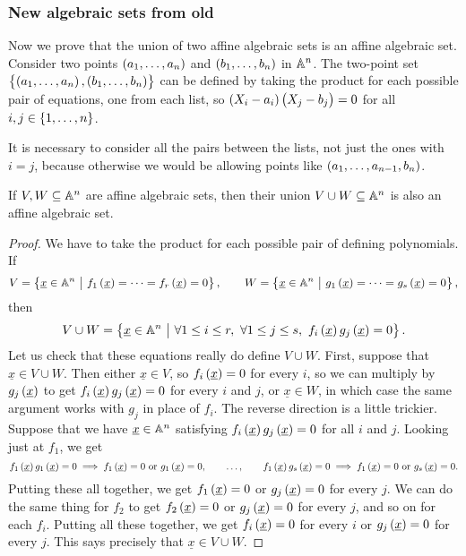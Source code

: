 \subsubsection{New algebraic sets from old}

Now we prove that the union of two affine algebraic sets is an affine algebraic set. Consider two points $ \br{a_1, \dots, a_n} $ and $ \br{b_1, \dots, b_n} $ in $ \AA^n $. The two-point set $ \cbr{\br{a_1, \dots, a_n}, \br{b_1, \dots, b_n}} $ can be defined by taking the product for each possible pair of equations, one from each list, so $ \br{X_i - a_i}\br{X_j - b_j} = 0 $ for all $ i, j \in \cbr{1, \dots, n} $.

\begin{note*}
It is necessary to consider all the pairs between the lists, not just the ones with $ i = j $, because otherwise we would be allowing points like $ \br{a_1, \dots, a_{n - 1}, b_n} $.
\end{note*}

\begin{lemma}
If $ V, W \subseteq \AA^n $ are affine algebraic sets, then their union $ V \cup W \subseteq \AA^n $ is also an affine algebraic set.
\end{lemma}


\begin{proof}
We have to take the product for each possible pair of defining polynomials. If
$$ V = \cbr{\underline{x} \in \AA^n \st f_1\br{\underline{x}} = \dots = f_r\br{\underline{x}} = 0}, \qquad W = \cbr{\underline{x} \in \AA^n \st g_1\br{\underline{x}} = \dots = g_s\br{\underline{x}} = 0}, $$
then
$$ V \cup W = \cbr{\underline{x} \in \AA^n \st \forall 1 \le i \le r, \ \forall 1 \le j \le s, \ f_i\br{\underline{x}}g_j\br{\underline{x}} = 0}. $$
Let us check that these equations really do define $ V \cup W $. First, suppose that $ \underline{x} \in V \cup W $. Then either $ \underline{x} \in V $, so $ f_i\br{\underline{x}} = 0 $ for every $ i $, so we can multiply by $ g_j\br{\underline{x}} $ to get $ f_i\br{\underline{x}}g_j\br{\underline{x}} = 0 $ for every $ i $ and $ j $, or $ \underline{x} \in W $, in which case the same argument works with $ g_j $ in place of $ f_i $. The reverse direction is a little trickier. Suppose that we have $ \underline{x} \in \AA^n $ satisfying $ f_i\br{\underline{x}}g_j\br{\underline{x}} = 0 $ for all $ i $ and $ j $. Looking just at $ f_1 $, we get
$$ f_1\br{\underline{x}}g_1\br{\underline{x}} = 0 \implies f_1\br{\underline{x}} = 0 \ \text{or} \ g_1\br{\underline{x}} = 0, \qquad \dots, \qquad f_1\br{\underline{x}}g_s\br{\underline{x}} = 0 \implies f_1\br{\underline{x}} = 0 \ \text{or} \ g_s\br{\underline{x}} = 0. $$
Putting these all together, we get $ f_1\br{\underline{x}} = 0 $ or $ g_j\br{\underline{x}} = 0 $ for every $ j $. We can do the same thing for $ f_2 $ to get $ f_2\br{\underline{x}} = 0 $ or $ g_j\br{\underline{x}} = 0 $ for every $ j $, and so on for each $ f_i $. Putting all these together, we get $ f_i\br{\underline{x}} = 0 $ for every $ i $ or $ g_j\br{\underline{x}} = 0 $ for every $ j $. This says precisely that $ \underline{x} \in V \cup W $.
\end{proof}

